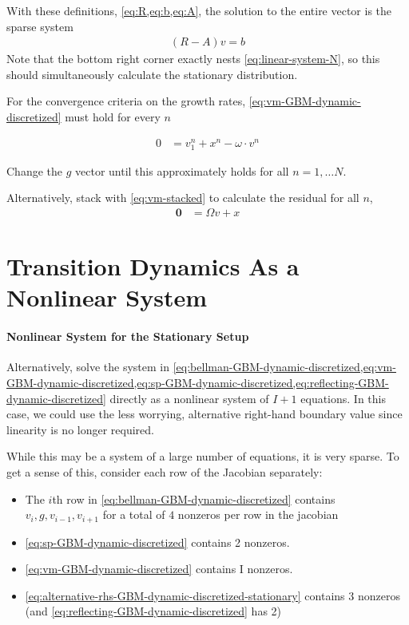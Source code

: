 \documentclass[11pt]{article}
\begin{document}
With these definitions, \cref{eq:R,eq:b,eq:A}, the solution to the entire vector is the sparse system
\begin{align}
(R - A) v = b \label{eq:linear-system}
\end{align}
Note that the bottom right corner exactly nests \cref{eq:linear-system-N}, so this should simultaneously calculate the stationary distribution.

For the convergence criteria on the growth rates, \cref{eq:vm-GBM-dynamic-discretized} must hold for every $n$

\begin{align}
0 &= v_1^n + x^n - \omega \cdot v^n
\end{align}

Change the $g$ vector until this approximately holds for all $n = 1,\ldots N$.

Alternatively, stack with \cref{eq:vm-stacked} to calculate the residual for all $n$,
\begin{align}
\mathbf{0} &= \Omega v + x
\end{align}

\section{Transition Dynamics As a Nonlinear System}
\paragraph{Nonlinear System for the Stationary Setup}
Alternatively, solve the system in \cref{eq:bellman-GBM-dynamic-discretized,eq:vm-GBM-dynamic-discretized,eq:sp-GBM-dynamic-discretized,eq:reflecting-GBM-dynamic-discretized} directly as a nonlinear system of $I+1$ equations.  In this case, we could use the less worrying, alternative right-hand boundary value since linearity is no longer required.

While this may be a system of a large number of equations, it is very sparse.  To get a sense of this, consider each row of the Jacobian separately:
\begin{itemize}
	\item The $i$th row in \cref{eq:bellman-GBM-dynamic-discretized} contains $v_i, g, v_{i-1}, v_{i+1}$ for a total of $4$ nonzeros per row in the jacobian
	\item \cref{eq:sp-GBM-dynamic-discretized} contains 2 nonzeros.
	\item \cref{eq:vm-GBM-dynamic-discretized} contains I nonzeros.
	\item \cref{eq:alternative-rhs-GBM-dynamic-discretized-stationary} contains 3 nonzeros (and \cref{eq:reflecting-GBM-dynamic-discretized} has 2)
\end{itemize}
\end{document}
